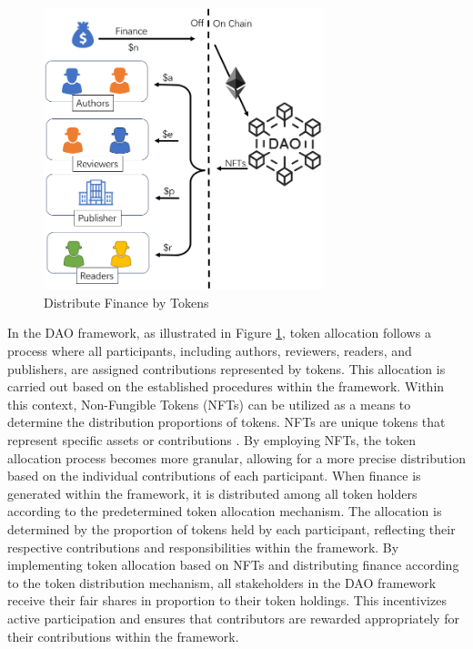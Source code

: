 \documentclass[lettersize,journal]{IEEEtran}
\begin{document}
\begin{figure}[h]
  \centering
  \includegraphics[width=3.2in]{assets/finance.png}
  \caption{Distribute Finance by Tokens}
  \label{fig:frameworkoffinance}
\end{figure}

In the DAO framework, as illustrated in Figure \ref{fig:frameworkoffinance}, token allocation follows a process where all participants, including authors, reviewers, readers, and publishers, are assigned contributions represented by tokens. This allocation is carried out based on the established procedures within the framework.
Within this context, Non-Fungible Tokens (NFTs) can be utilized as a means to determine the distribution proportions of tokens. NFTs are unique tokens that represent specific assets or contributions \cite{10034436}. By employing NFTs, the token allocation process becomes more granular, allowing for a more precise distribution based on the individual contributions of each participant.
When finance is generated within the framework, it is distributed among all token holders according to the predetermined token allocation mechanism. The allocation is determined by the proportion of tokens held by each participant, reflecting their respective contributions and responsibilities within the framework.
By implementing token allocation based on NFTs and distributing finance according to the token distribution mechanism, all stakeholders in the DAO framework receive their fair shares in proportion to their token holdings. This incentivizes active participation and ensures that contributors are rewarded appropriately for their contributions within the framework.
\end{document}
